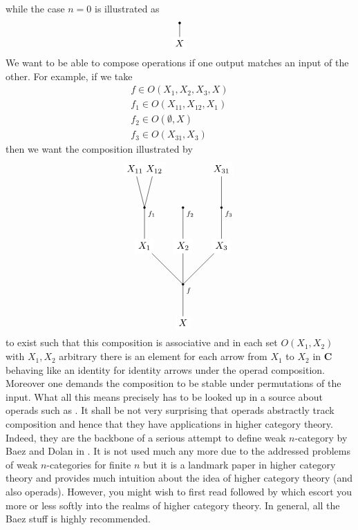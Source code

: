 while the case $n = 0$ is illustrated as
\[
\begin{tikzpicture}[scale=0.75]
  \filldraw
    (0,0) node[fill=white] {$X$}
    --
    (0,1) circle (1.5pt) node[below right] {};
\end{tikzpicture}
\]
We want to be able to compose operations if one output matches an input of the other. For example, if we take
\begin{align*}
  f
  \in
  O(X_{1},X_{2},X_{3},X)
  \\
  f_{1}
  \in
  O(X_{11},X_{12},X_{1})
  \\
  f_{2}
  \in
  O(\emptyset,X)
  \\
  f_{3}
  \in
  O(X_{31},X_{3})
\end{align*}
then we want the composition illustrated by
\[
\begin{tikzpicture}[scale=0.70]
  \filldraw
    (0,0) node[fill=white] {$X$}
    --
    (0,2) circle (1.5pt) node[below right] {\scriptsize{$f$}};
  \draw
    (0,2)
    --
    (-2,4) node[fill=white] {$X_{1}$};
  \draw
    (0,2)
    --
    (0,4) node[fill=white] {$X_{2}$};
  \draw
    (0,2)
    --
    (2,4) node[fill=white] {$X_{3}$};
  \filldraw
    (-2,4) node[fill=white] {$X_{1}$}
    --
    (-2,6)
    circle (1.5pt) node[below right] {\scriptsize{$f_{1}$}};
  \draw
    (-2,6)
    --
    (-2.5,8) node[fill=white] {$X_{11}$};
  \draw
    (-2,6)
    --
    (-1.5,8) node[fill=white] {$X_{12}$};
  \filldraw
    (0,4) node[fill=white] {$X_{2}$}
    --
    (0,6) circle (1.5pt) node[below right] {\scriptsize{$f_{2}$}};
  \filldraw
    (2,4) node[fill=white] {$X_{3}$}
    --
    (2,6) circle (1.5pt) node[below right] {\scriptsize{$f_{3}$}};
  \draw
    (2,6)
    --
    (2,8) node[fill=white] {$X_{31}$};
\end{tikzpicture}
\]
to exist such that this composition is associative and in each set $O(X_{1},X_{2})$ with $X_{1},X_{2}$ arbitrary there is an element for each arrow from $X_{1}$ to $X_{2}$ in $\mathbf{C}$ behaving like an identity for identity arrows under the operad composition. Moreover one demands the composition to be {\glqq}stable{\grqq} under permutations of the input. What all this means precisely has to be looked up in a source about operads such as \cite{0d7b89ad}. It shall be not very surprising that operads abstractly track composition and hence that they have applications in higher category theory. Indeed, they are the backbone of a serious attempt to define weak $n$-category by Baez and Dolan in \cite{0d7b89ad}. It is not used much any more due to the addressed problems of weak $n$-categories for finite $n$ but it is a landmark paper in higher category theory and provides much intuition about the idea of higher category theory (and also operads). However, you might wish to first read \cite{de09a3f9} followed by \cite{c2d89e8a} which escort you more or less softly into the realms of higher category theory. In general, all the Baez stuff is highly recommended.
